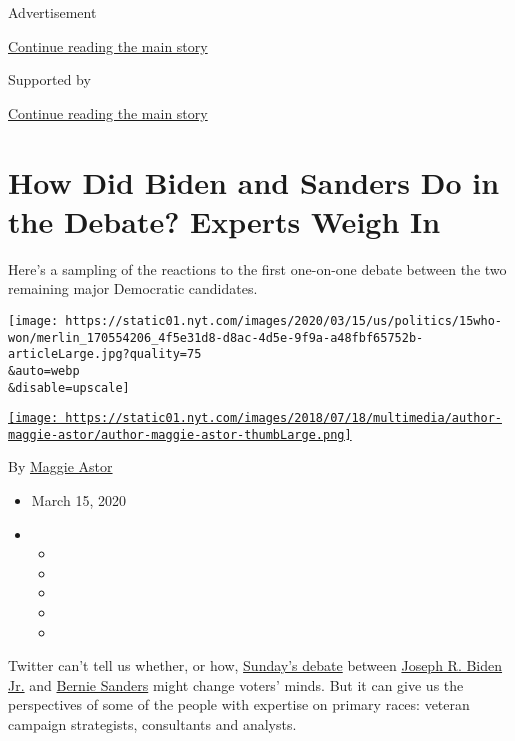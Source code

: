 Advertisement

\protect\hyperlink{after-top}{Continue reading the main story}

Supported by

\protect\hyperlink{after-sponsor}{Continue reading the main story}

\hypertarget{how-did-biden-and-sanders-do-in-the-debate-experts-weigh-in}{%
\section{How Did Biden and Sanders Do in the Debate? Experts Weigh
In}\label{how-did-biden-and-sanders-do-in-the-debate-experts-weigh-in}}

Here's a sampling of the reactions to the first one-on-one debate
between the two remaining major Democratic candidates.

\texttt{[image: https://static01.nyt.com/images/2020/03/15/us/politics/15who-won/merlin\_170554206\_4f5e31d8-d8ac-4d5e-9f9a-a48fbf65752b-articleLarge.jpg?quality=75\\\&auto=webp\\\&disable=upscale]}

\href{https://www.nytimes.com/by/maggie-astor}{\texttt{[image: https://static01.nyt.com/images/2018/07/18/multimedia/author-maggie-astor/author-maggie-astor-thumbLarge.png]}}

By \href{https://www.nytimes.com/by/maggie-astor}{Maggie Astor}

\begin{itemize}
\item
  March 15, 2020
\item
  \begin{itemize}
  \item
  \item
  \item
  \item
  \item
  \end{itemize}
\end{itemize}

Twitter can't tell us whether, or how,
\href{https://www.nytimes.com/2020/03/15/us/politics/biden-sanders-debate-recap.html}{Sunday's
debate} between
\href{https://www.nytimes.com/interactive/2020/us/elections/joe-biden.html}{Joseph
R. Biden Jr.} and
\href{https://www.nytimes.com/interactive/2020/us/elections/bernie-sanders.html}{Bernie
Sanders} might change voters' minds. But it can give us the perspectives
of some of the people with expertise on primary races: veteran campaign
strategists, consultants and analysts.

